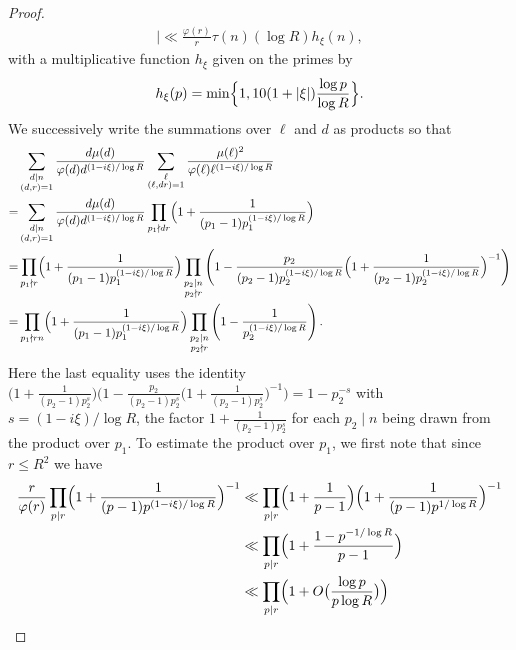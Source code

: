 \documentclass[12pt]{amsart}
\theoremstyle{definition}
\theoremstyle{remark}
\numberwithin{equation}{section}
\newcommand{\1}{\mathbf{1}}
\begin{document}
\begin{proof}
\begin{align}
{{        }} \Bigr| \ll \frac{\varphi(r)}{r}\tau(n)  (\log R) h_\xi(n),
    \end{align}
    with a multiplicative function $h_\xi$ given on the primes by
    \begin{align*}
        h_{\xi}(p)=\min\Bigl\{1,10(1+|\xi|)\frac{\log p}{\log R} \Bigr\}.
    \end{align*}
    We successively write the summations over $\ell$ and $d$ as products so that
    \begin{align*}
        &\sum_{\substack{d\mid n\\ (d,r)=1}}\frac{d\mu(d)}{\varphi(d)d^{(1-i\xi)/\log R
        }}\sum_{\substack{\ell \\(\ell,dr)=1}}\frac{\mu(\ell)^2}{\varphi(\ell)\ell^{(1-i\xi)/\log R
        }}\\
        =&\sum_{\substack{d\mid n\\ (d,r)=1}}\frac{d\mu(d)}{\varphi(d)d^{(1-i\xi)/\log R
        }} \prod_{p_1\nmid dr}\Bigl(1+\frac{1}{(p_1-1)p_1^{(1-i\xi)/\log R}} \Bigr)\\
        =&\prod_{p_1\nmid r}\Bigl(1+\frac{1}{(p_1-1)p_1^{(1-i\xi)/\log R}} \Bigr)\prod_{\substack{p_2\mid n\\ p_2\nmid r}}\left(1-\frac{p_2}{(p_2-1)p_2^{(1-i\xi)/\log R}} \Bigl(1+\frac{1}{(p_2-1)p_2^{(1-i\xi)/\log R}} \Bigr)^{-1}\right)\\
        =&\prod_{p_1\nmid r n}\Bigl(1+\frac{1}{(p_1-1)p_1^{(1-i\xi)/\log R}} \Bigr)\prod_{\substack{p_2\mid n\\ p_2\nmid r}}\left(1-\frac{1}{p_2^{(1-i\xi)/\log R}}\right).
    \end{align*}
    Here the last equality uses the identity $\bigl(1+\tfrac{1}{(p_2-1)p_2^{s}}\bigr)\bigl(1-\tfrac{p_2}{(p_2-1)p_2^{s}}\bigl(1+\tfrac{1}{(p_2-1)p_2^{s}}\bigr)^{-1}\bigr)=1-p_2^{-s}$ with $s=(1-i\xi)/\log R$, the factor $1+\tfrac{1}{(p_2-1)p_2^{s}}$ for each $p_2\mid n$ being drawn from the product over $p_1$.
    To estimate the product over $p_1$, we first note that since $r\leq R^2$ we have
    \begin{align*}
        \frac{r}{\varphi(r)}  \prod_{p\mid r }\Bigl(1+\frac{1}{(p-1)p^{(1-i\xi)/\log R}} \Bigr)^{-1}&\ll \prod_{p\mid r }\Bigl(1+\frac{1}{p-1}\Bigr)\Bigl(1+\frac{1}{(p-1)p^{1/\log R}}\Bigr)^{-1}\\
        &\ll  \prod_{p\mid r }\Bigl(1+\frac{1-p^{-1/\log R}}{p-1}\Bigr)\\&\ll \prod_{p\mid r} \Bigl(1+O\bigl(\frac{\log p}{p \log R}\bigr)\Bigr)\\

\end{align*}
\end{proof}
\end{document}
